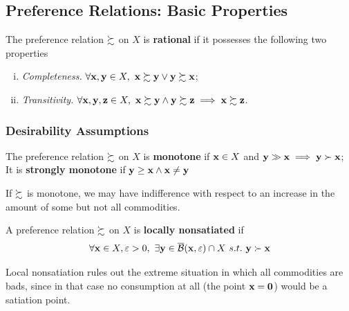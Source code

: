 \documentclass{article}
\begin{document}
 		\subsection{Preference Relations: Basic Properties}
 			\begin{definition}[3.B.1]
 				The preference relation $\succsim$ on $X$ is \textbf{rational} if it possesses the following two properties
 				\begin{enumerate}[(i)]
 					\item \emph{Completeness.} $\forall \textbf{x}, \textbf{y} \in X,\ \textbf{x} \succsim \textbf{y} \lor \textbf{y} \succsim \textbf{x}$;
 					\item \emph{Transitivity.} $\forall \textbf{x}, \textbf{y}, \textbf{z} \in X,\ \textbf{x} \succsim \textbf{y} \land \textbf{y} \succsim \textbf{z} \implies \textbf{x} \succsim \textbf{z}$.
 				\end{enumerate}
 			\end{definition}
 			
 			\subsubsection{Desirability Assumptions}
 			
 			\begin{definition}[3.B.2]
 				The preference relation $\succsim$ on $X$ is \textbf{monotone} if $\textbf{x} \in X$ and $\textbf{y} \gg \textbf{x} \implies \textbf{y} \succ \textbf{x}$; It is \textbf{strongly monotone} if $\textbf{y} \geq \textbf{x} \land \textbf{x} \neq \textbf{y}$
 			\end{definition}
 			
 			\begin{remark}
 				If $\succsim$ is monotone, we may have indifference with respect to an increase in the amount of some but not all commodities.
 			\end{remark}
 			
 			\begin{definition}[3.B.3]
 				A preference relation $\succsim$ on $X$ is \textbf{locally nonsatiated} if
 				\begin{equation}
 					\forall \textbf{x} \in X, \varepsilon > 0,\ \exists \textbf{y} \in \overline{\mathcal{{B}}}(\textbf{x}, \varepsilon) \cap X\ s.t.\ \textbf{y} \succ \textbf{x}
 				\end{equation}
 			\end{definition}
 			
 			\begin{remark}
 				Local nonsatiation rules out the extreme situation in which all commodities are bads, since in that case no consumption at all (the point $\textbf{x} = \textbf{0}$) would be a satiation point.
 			\end{remark}
 			
\end{document}
